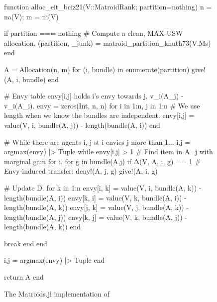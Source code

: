 \begin{figure}[ht!]
\begin{jllisting}
function alloc_eit_bciz21(V::MatroidRank; partition=nothing)
  n = na(V); m = ni(V)

  if partition === nothing
    # Compute a clean, MAX-USW allocation.
    (partition, _junk) = matroid_partition_knuth73(V.Ms)
  end
  
  A = Allocation(n, m)
  for (i, bundle) in enumerate(partition)
    give!(A, i, bundle)
  end

  # Envy table envy[i,j] holds i's envy towards j, v_i(A_j) - v_i(A_i).
  envy = zeros(Int, n, n)
  for i in 1:n, j in 1:n
    # We use length when we know the bundles are independent.
    envy[i,j] = value(V, i, bundle(A, j)) - length(bundle(A, i))
  end

  # While there are agents i, j st i envies j more than 1...
  i,j = argmax(envy) |> Tuple
  while envy[i,j] > 1
    # Find item in A_j with marginal gain for i.
    for g in bundle(A,j)
      if Δ(V, A, i, g) == 1
        # Envy-induced transfer:
        deny!(A, j, g)
        give!(A, i, g)
    
        # Update D.
        for k in 1:n
          envy[i, k] = value(V, i, bundle(A, k)) - length(bundle(A, i))
          envy[k, i] = value(V, k, bundle(A, i)) - length(bundle(A, k))
          envy[j, k] = value(V, j, bundle(A, k)) - length(bundle(A, j))
          envy[k, j] = value(V, k, bundle(A, j)) - length(bundle(A, k))
        end

        break
      end
    end

    i,j = argmax(envy) |> Tuple
  end

  return A
end
\end{jllisting}
\caption{The Matroids.jl implementation of }
\label{code:Envy-Induced-Transfers}
\end{figure}

